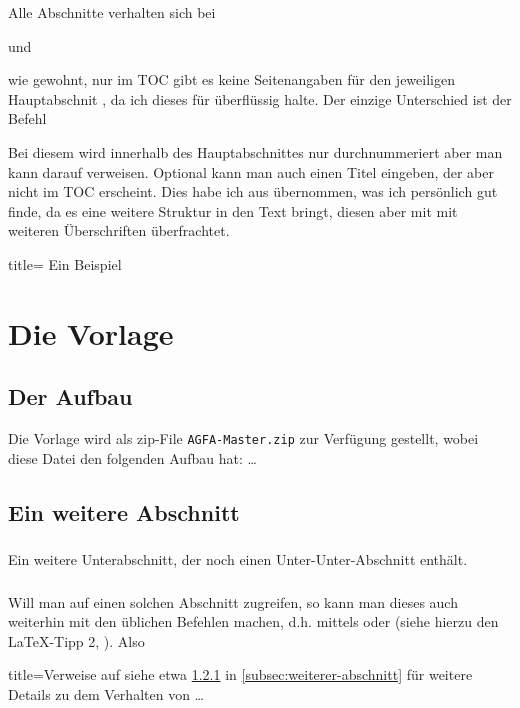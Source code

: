 Alle Abschnitte verhalten sich bei 
%
\begin{tcolorbox}
\end{tcolorbox}
%
und
%
\begin{tcolorbox}
\end{tcolorbox}
%
wie gewohnt, nur im TOC gibt es keine Seitenangaben für den jeweiligen Hauptabschnit , da ich dieses für überflüssig halte.
Der einzige Unterschied ist der Befehl
%
\begin{tcolorbox}
\brackets{}
\end{tcolorbox}
%
Bei diesem wird innerhalb des Hauptabschnittes nur durchnummeriert aber man kann darauf verweisen.
Optional kann man auch einen Titel eingeben, der aber nicht im TOC erscheint.
Dies habe ich aus \textcite{bourbaki:spectrales} übernommen, was ich persönlich gut finde, da es eine weitere Struktur in den Text bringt, diesen aber mit mit weiteren Überschriften überfrachtet.
%
\begin{NoTOCEntry}
\begin{tcblisting}{title= Ein Beispiel}
\section{Die Vorlage}\label{sec:section1}
\subsection{Der Aufbau}\label{subsec:aufbau}
Die Vorlage wird als zip-File \texttt{AGFA-Master.zip} zur Verfügung gestellt, wobei diese Datei den folgenden Aufbau hat: \ldots
\subsection{Ein weitere Abschnitt}\label{subsec:weiterer-abschnitt}
\subsubsection{}\label{subsubsec:test}
Ein weitere Unterabschnitt, der noch einen Unter-Unter-Abschnitt enthält. 
\end{tcblisting}
\end{NoTOCEntry}
\subsubsection{}
Will man auf einen solchen Abschnitt zugreifen, so kann man dieses auch weiterhin mit den üblichen Befehlen machen, d.h. mittels  oder  (siehe hierzu den \LaTeX{}-Tipp 2, \cite{latextipps2}).
Also
%
\begin{tcblisting}{title=Verweise auf  }
siehe etwa \ref{subsubsec:test} in \vref{subsec:weiterer-abschnitt} für weitere Details zu dem Verhalten von \ldots
\end{tcblisting}
%
